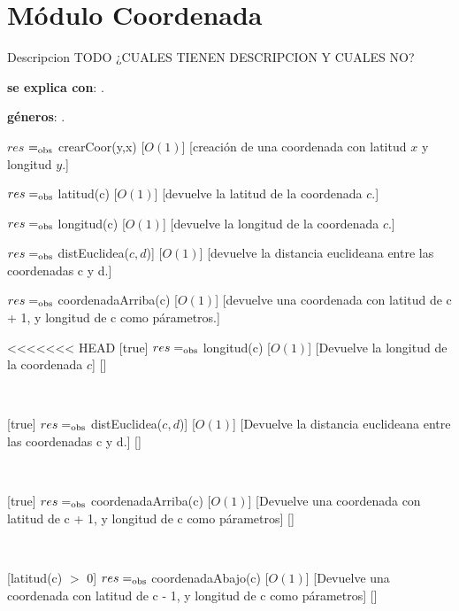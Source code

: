 \section{Módulo Coordenada}

Descripcion TODO ¿CUALES TIENEN DESCRIPCION Y CUALES NO?

\begin{Interfaz}

	\textbf{se explica con}: .

	\textbf{géneros}: .


	{$res$ $=_{\mathrm{obs}}$ crearCoor(y,x)}
	[$O(1)$]
	[creación de una coordenada con latitud $x$ y longitud $y$.]

	{$res =_{\mathrm{obs}}$ latitud(c)}
	[$O(1)$]
	[devuelve la latitud de la coordenada $c$.]

	{$res =_{\mathrm{obs}}$ longitud(c)}
	[$O(1)$]
	[devuelve la longitud de la coordenada $c$.]

	{$res =_{\mathrm{obs}}$ distEuclidea($c, d$)]}
	[$O(1)$]
	[devuelve la distancia euclideana entre las coordenadas c y d.]

	{$res =_{\mathrm{obs}}$ coordenadaArriba(c)}
	[$O(1)$]
	[devuelve una coordenada con latitud de c + 1, y longitud de c como párametros.]

<<<<<<< HEAD
[true]
{$res =_{\mathrm{obs}}$ longitud(c)}
[$O(1)$]
[Devuelve la longitud de la coordenada $c$]
[]

~

[true]
{$res =_{\mathrm{obs}}$ distEuclidea($c, d$)]}
[$O(1)$]
[Devuelve la distancia euclideana entre las coordenadas c y d.]
[]

~

[true]
{$res =_{\mathrm{obs}}$ coordenadaArriba(c)}
[$O(1)$]
[Devuelve una coordenada con latitud de c + 1, y longitud de c como párametros]
[]

~

[latitud(c) $>$ 0]
{$res =_{\mathrm{obs}}$ coordenadaAbajo(c)}
[$O(1)$]
[Devuelve una coordenada con latitud de c - 1, y longitud de c como párametros]
[]


\end{Interfaz}
